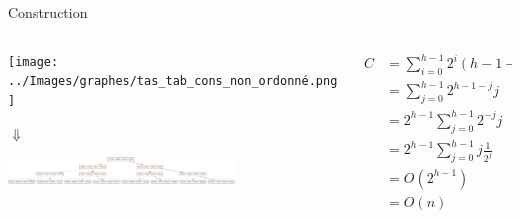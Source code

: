 \documentclass[11pt]{beamer}
\begin{document}
\begin{frame}[fragile]{Construction\cite{ACM}}
\begin{columns}[t]
  \begin{column}{5cm}
  
    \texttt{[image: ../Images/graphes/tas\_tab\_cons\_non\_ordonné.png]} 
    
    \begin{center}
    \medskip
    \;\;\;\;\;\;\;\;\; $\Downarrow$
    \medskip
    \end{center}
    

  \includegraphics[width=6cm]{../Images/graphes/tas_arbre_cons.png} 



  \end{column}
  
  \begin{column}{5cm}
  
  \begin{scriptsize}
  
    \begin{align}
C &= \sum_{i = 0}^{h-1} 2^i (h - 1 - i)\\
&=  \sum_{j = 0}^{h-1} 2^{h-1-j} j\\
&= 2^{h-1} \sum_{j=0}^{h-1} 2^{-j} j\\
&= 2^{h-1} \sum_{j=0}^{h-1} j \frac{1}{2^j} \\
&= O(2^{h-1})\\
&= O(n)
\end{align}
  \end{scriptsize}


  
  
  \end{column}
 \end{columns}  
\end{frame}
\end{document}
